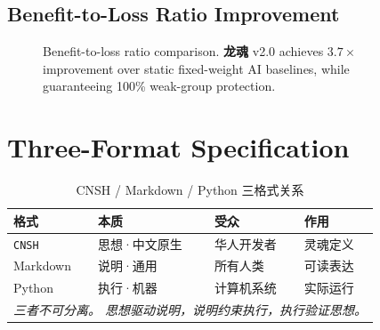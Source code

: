 \documentclass[conference]{IEEEtran}
\newcommand{\LH}{\textcolor{dragonRed}{\textbf{龙魂}}}
\newcommand{\CNSH}{\texttt{\textcolor{dnaBlue}{CNSH}}}
\begin{document}
\subsection{Benefit-to-Loss Ratio Improvement}

\begin{figure}[t]
\centering
{}
\caption{Benefit-to-loss ratio comparison.
  \LH{} v2.0 achieves $3.7\times$ improvement over
  static fixed-weight AI baselines,
  while guaranteeing 100\% weak-group protection.}
\label{fig:eval-bar}
\end{figure}

\section{Three-Format Specification}
\label{sec:formats}

\begin{table}[t]
\centering
\caption{CNSH / Markdown / Python 三格式关系}
\label{tab:formats}
\renewcommand{\arraystretch}{1.2}
\begin{tabular}{llll}
\toprule
\textbf{格式} & \textbf{本质}
  & \textbf{受众} & \textbf{作用} \\
\midrule
\CNSH{} & 思想·中文原生
  & 华人开发者 & 灵魂定义 \\
Markdown & 说明·通用
  & 所有人类 & 可读表达 \\
Python & 执行·机器
  & 计算机系统 & 实际运行 \\
\midrule
\multicolumn{4}{l}{%
  \textit{三者不可分离。
    思想驱动说明，说明约束执行，执行验证思想。}} \\
\bottomrule
\end{tabular}
\end{table}
\end{document}
